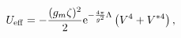 \begin{equation}
U_{\rm eff}=-{(g_m\zeta )^2\over 2}{\rm e}^{-{4\pi\over
g^2}\Lambda}\left(V^4+V^{*4}\right),
\end{equation}

